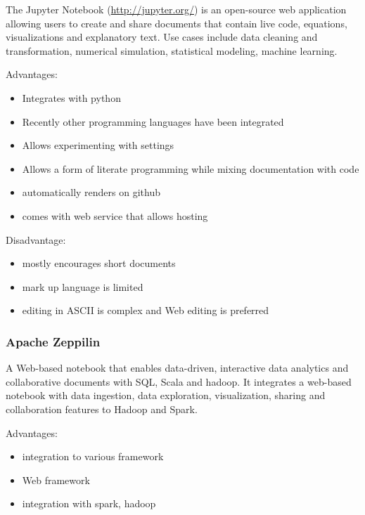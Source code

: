 The Jupyter Notebook (\url{http://jupyter.org/}) is an open-source web
application allowing users to create and share documents that contain
live code, equations, visualizations and explanatory text. Use cases
include data cleaning and transformation, numerical simulation,
statistical modeling, machine learning.

Advantages:

\begin{itemize}

\item
  Integrates with python
\item
  Recently other programming languages have been integrated
\item
  Allows experimenting with settings
\item
  Allows a form of literate programming while mixing documentation with
  code
\item
  automatically renders on github
\item
  comes with web service that allows hosting
\end{itemize}

Disadvantage:

\begin{itemize}

\item
  mostly encourages short documents
\item
  mark up language is limited
\item
  editing in ASCII is complex and Web editing is preferred
\end{itemize}

\subsubsection{Apache Zeppilin}\label{apache-zeppilin}

A Web-based notebook that enables data-driven, interactive data
analytics and collaborative documents with SQL, Scala and hadoop. It
integrates a web-based notebook with data ingestion, data exploration,
visualization, sharing and collaboration features to Hadoop and Spark.

Advantages:

\begin{itemize}

\item
  integration to various framework
\item
  Web framework
\item
  integration with spark, hadoop
\end{itemize}

